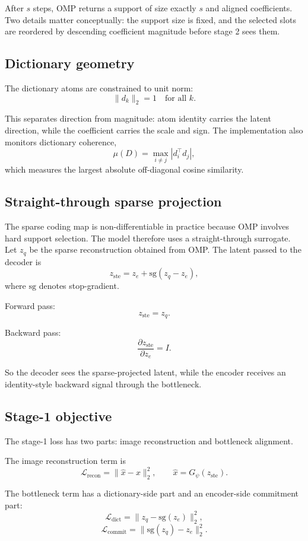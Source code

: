 \documentclass[11pt]{article}
\begin{document}
After $s$ steps, OMP returns a support of size exactly $s$ and aligned coefficients. Two details matter conceptually: the support size is fixed, and the selected slots are reordered by descending coefficient magnitude before stage 2 sees them.

\subsection{Dictionary geometry}

The dictionary atoms are constrained to unit norm:
\[
\|d_k\|_2 = 1 \quad \text{for all } k.
\]

This separates direction from magnitude: atom identity carries the latent direction, while the coefficient carries the scale and sign. The implementation also monitors dictionary coherence,
\[
\mu(D) = \max_{i \ne j} |d_i^\top d_j|,
\]
which measures the largest absolute off-diagonal cosine similarity.

\subsection{Straight-through sparse projection}

The sparse coding map is non-differentiable in practice because OMP involves hard support selection. The model therefore uses a straight-through surrogate. Let $z_q$ be the sparse reconstruction obtained from OMP. The latent passed to the decoder is
\[
z_{\text{ste}} = z_e + \mathrm{sg}(z_q - z_e),
\]
where $\mathrm{sg}$ denotes stop-gradient.

Forward pass:
\[
z_{\text{ste}} = z_q.
\]

Backward pass:
\[
\frac{\partial z_{\text{ste}}}{\partial z_e} = I.
\]

So the decoder sees the sparse-projected latent, while the encoder receives an identity-style backward signal through the bottleneck.

\subsection{Stage-1 objective}

The stage-1 loss has two parts: image reconstruction and bottleneck alignment.

The image reconstruction term is
\[
\mathcal{L}_{\text{recon}}
=
\|\hat x - x\|_2^2,
\qquad
\hat x = G_\psi(z_{\text{ste}}).
\]

The bottleneck term has a dictionary-side part and an encoder-side commitment part:
\[
\mathcal{L}_{\text{dict}}
=
\|z_q - \mathrm{sg}(z_e)\|_2^2,
\]
\[
\mathcal{L}_{\text{commit}}
=
\|\mathrm{sg}(z_q) - z_e\|_2^2.
\]
\end{document}
